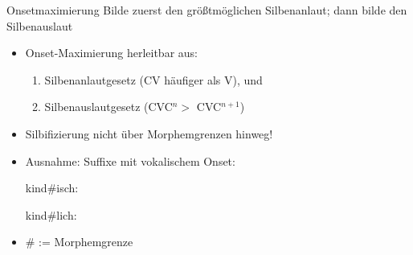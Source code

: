 \begin{frame}

\begin{block}{Onsetmaximierung}
Bilde zuerst den größtmöglichen Silbenanlaut; dann bilde den Silbenauslaut \citep[218]{Hall00a}
\end{block}


\begin{itemize}
	\item Onset-Maximierung herleitbar aus:
	\begin{enumerate}
		\item Silbenanlautgesetz (CV häufiger als V), und
		\item Silbenauslautgesetz (CVC$^{n} >$ CVC$^{n+1}$)
	\end{enumerate}

\pause
	\item Silbifizierung nicht über Morphemgrenzen hinweg! 
	\item Ausnahme: Suffixe mit vokalischem Onset:
	
	  \ea
          kind\#isch: 
          \z
	
	  \ea
          kind\#lich: \textipa{[kInt.lI\c{c}]}
          \z
          
     \item \# := Morphemgrenze


	
\end{itemize}

\end{frame}



